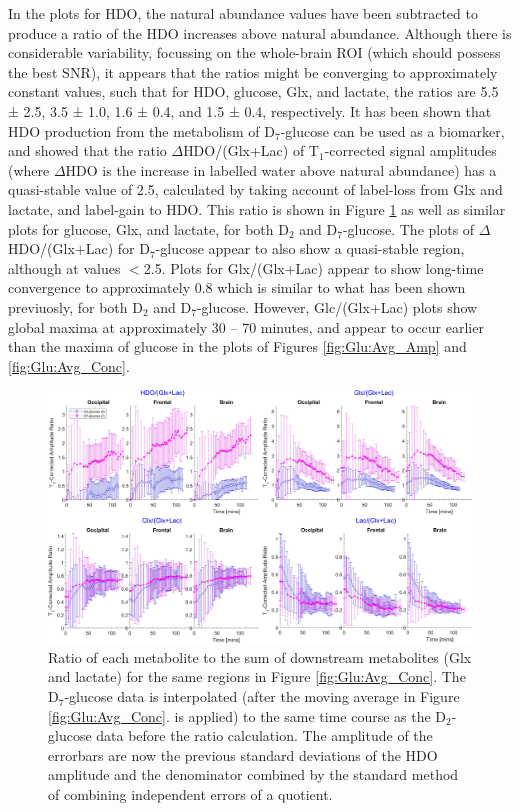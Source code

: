 \documentclass[class=article, crop=false]{standalone}
\begin{document}
In the plots for HDO, the natural abundance values have been subtracted to produce a ratio of the HDO increases above natural abundance. Although there is considerable variability, focussing on the whole-brain ROI (which should possess the best SNR), it appears that the ratios might be converging to approximately constant values, such that for HDO, glucose, Glx, and lactate, the ratios are 5.5 ± 2.5, 3.5 ± 1.0, 1.6 ± 0.4, and 1.5 ± 0.4, respectively. It has been shown that HDO production from the metabolism of D$_7$-glucose can be used as a biomarker\cite{Mahar2021DeuteratedGlucose}, and showed that the ratio $\Delta$HDO/(Glx+Lac) of T$_1$-corrected signal amplitudes (where $\Delta$HDO is the increase in labelled water above natural abundance) has a quasi-stable value of 2.5, calculated by taking account of label-loss from Glx and lactate, and label-gain to HDO. This ratio is shown in Figure \ref{fig:Glu:HDO_Rat} as well as similar plots for glucose, Glx, and lactate, for both D$_2$ and D$_7$-glucose. The plots of $\Delta$HDO/(Glx+Lac) for D$_7$-glucose appear to also show a quasi-stable region, although at values $<$2.5. Plots for Glx/(Glx+Lac) appear to show long-time convergence to approximately 0.8 which is similar to what has been shown previuosly\cite{Kaggie2022DeuteriumMetabolism}, for both D$_2$ and D$_7$-glucose. However, Glc/(Glx+Lac) plots show global maxima at approximately 30 – 70 minutes, and appear to occur earlier than the maxima of glucose in the plots of Figures \ref{fig:Glu:Avg_Amp} and \ref{fig:Glu:Avg_Conc}.  

\begin{figure}
    \centering
    \includegraphics[width = 1\textwidth]{Figures/Glucose/HDO_Ratio.png}
    \caption{Ratio of each metabolite to the sum of downstream metabolites (Glx and lactate) for the same regions in Figure \ref{fig:Glu:Avg_Conc}. The D$_7$-glucose data is interpolated (after the moving average in Figure \ref{fig:Glu:Avg_Conc}. is applied) to the same time course as the D$_2$-glucose data before the ratio calculation. The amplitude of the errorbars are now the previous standard deviations of the HDO amplitude and the denominator combined by the standard method of combining independent errors of a quotient.}
    \label{fig:Glu:HDO_Rat}
\end{figure}
\end{document}
